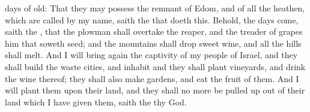 {days of
old:
That they may
possess the
remnant of
Edom, and of all the
heathen, which are
called by my
name,
saith the
{} that
doeth this.
Behold, the
days
come,
saith the
{}, that the
plowman shall
overtake the
reaper, and the
treader of
grapes him that
soweth
seed; and the
mountains shall
drop sweet
wine, and all the
hills shall
melt.
And I will bring
again the
captivity of my
people of
Israel, and they shall
build the
waste
cities, and
inhabit
{} and they shall
plant
vineyards, and
drink the
wine thereof; they shall also
make
gardens, and
eat the
fruit of them.
And I will
plant them upon their
land, and they shall no more be pulled
up out of their
land which I have
given them,
saith the
{} thy
God.
\par }